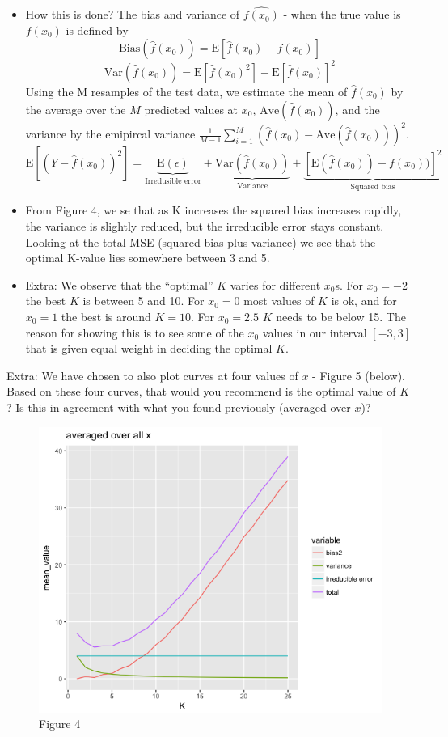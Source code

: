 \documentclass[]{article}
\begin{document}
\begin{itemize}
\item
  {How this is done? The bias and variance of \(\hat{f(x_0)}\) - when
  the true value is \(f(x_0)\) is defined by \[
  \text{Bias}(\hat f(x_0)) =\text{E}[\hat f(x_0) - f(x_0)]
  \] \[
  \text{Var}(\hat f(x_0)) = \text{E}[\hat f(x_0)^2] - \text{E}[\hat f(x_0)]^2
  \] Using the M resamples of the test data, we estimate the mean of
  \(\hat f(x_0)\) by the average over the \(M\) predicted values at
  \(x_0\), \(\text{Ave}(\hat{f}(x_0))\), and the variance by the
  emipircal variance
  \(\frac{1}{M-1} \sum_{i=1}^M (\hat{f}(x_0)-\text{Ave}(\hat{f}(x_0)))^2\).}
  \[
  \text{E}\left[\left(Y-\hat{f}\left(x_0\right)\right)^2\right]=\underbrace{\text{E}(\epsilon)}_{\text{Irredusible error}}+\underbrace{\text{Var}\left(\hat{f}\left(x_0\right)\right)}_{\text{Variance}}+\underbrace{\left[\text{E}\left(\hat{f}\left(x_0\right)\right)-f(x_0))\right]^2}_{\text{Squared bias}}
  \]
\item
  { From Figure 4, we se that as K increases the squared bias increases
  rapidly, the variance is slightly reduced, but the irreducible error
  stays constant. Looking at the total MSE (squared bias plus variance)
  we see that the optimal K-value lies somewhere between 3 and 5.}
\item
  { Extra: We observe that the ``optimal'' \(K\) varies for different
  \(x_0\)s. For \(x_0=-2\) the best \(K\) is between 5 and 10. For
  \(x_0=0\) most values of \(K\) is ok, and for \(x_0=1\) the best is
  around \(K=10\). For \(x_0=2.5\) \(K\) needs to be below 15. The
  reason for showing this is to see some of the \(x_0\) values in our
  interval \([-3,3]\) that is given equal weight in deciding the optimal
  \(K\).}
\end{itemize}

Extra: We have chosen to also plot curves at four values of \(x\) -
Figure 5 (below). Based on these four curves, that would you recommend
is the optimal value of \(K\)? Is this in agreement with what you found
previously (averaged over \(x\))?

\begin{figure}
\centering
\includegraphics{Prob1f4.png}
\caption{Figure 4}
\end{figure}
\end{document}
